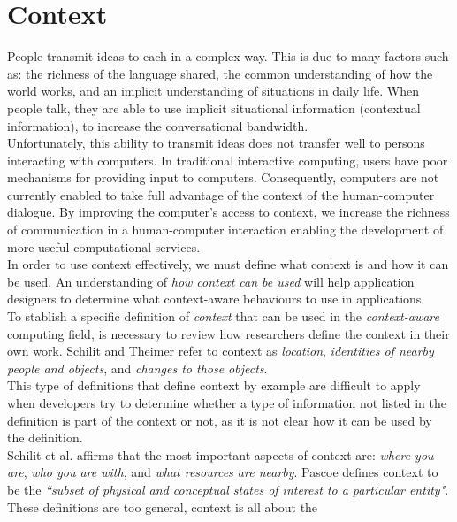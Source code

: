 \section{Context}
People transmit ideas to each in a complex way. This
is due to many factors such as: the richness of the language shared, the common
understanding of how the world works, and an implicit understanding of
situations in daily life. When people talk, they are able to use implicit
situational information (contextual information), to increase the
conversational bandwidth. \\Unfortunately, this ability to transmit
ideas does not transfer well to persons interacting with computers. In
traditional interactive computing, users have poor mechanisms for
providing input to computers. Consequently, computers are not
currently enabled to take full advantage of the context of the 
human-computer dialogue. By improving the computer's access to context, 
we increase the richness of communication in a human-computer interaction
enabling the development of more useful computational 
services.\\
In order to use context effectively, we must define what context
is and how it can be used. An understanding of \textit{how context can
be used} will help application designers to determine what 
context-aware behaviours to use in applications\cite{dey2001understanding}.\\
To stablish a specific definition of \textit{context} that can be used
in the \textit{context-aware} computing field, is necessary to review
how researchers define the context in their own work. Schilit and
Theimer\cite{abowd1999towards} refer to context as \textit{location},
\textit{identities of nearby people and objects}, and \textit{changes
to those objects}.\\
This type of definitions that define context by example
are difficult to apply when developers try to determine whether a type of
information not listed in the definition is part of the context or not, 
as it is not clear how it can be used by the definition.\\ 
Schilit et al.\cite{schilit1994context} affirms that the most important
aspects of context are: \textit{where you are}, \textit{who you are
with}, and \textit{what resources are nearby}.
Pascoe\cite{pascoe1998adding} defines context to be the
\textit{``subset of physical and  conceptual states of interest to a
particular entity"}.\\
These definitions are too general, context is all about the
